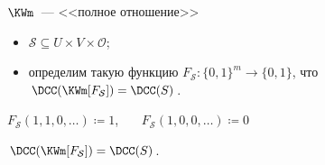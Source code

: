 \begin{frame}{$\KWm$~--- <<полное отношение>>}

    \begin{itemize}
        \item $\mathcal{S} \subseteq U \times V \times \mathcal{O}$;
        \item определим такую функцию $F_{\mathcal{S}}\colon \{0, 1\}^m \to \{0, 1\}$, что
            $\DCC(\KWm[F_{\mathcal{S}}]) = \DCC(S)$.
    \end{itemize}

    \pause

    \vspace{-0.2cm}
    \begin{center}
        
    \end{center}

    \pause
    $F_{\mathcal{S}}(1, 1, 0, \dots) \coloneqq 1$\pause, ~~~$F_{\mathcal{S}}(1, 0, 0, \dots) \coloneqq 0$

    \pause
    \begin{lemma}
        $\DCC(\KWm[F_{\mathcal{S}}]) = \DCC(S)$.
    \end{lemma}

    \pause

\end{frame}

